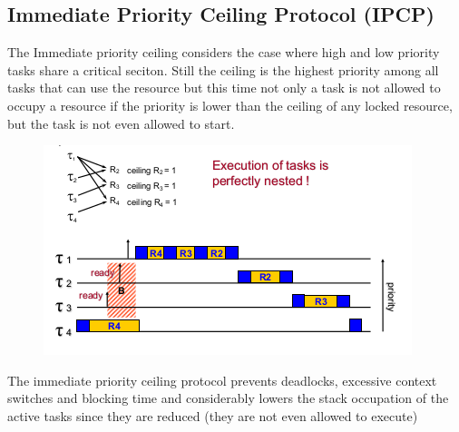 \subsection{Immediate Priority Ceiling Protocol (IPCP)}

The Immediate priority ceiling considers the case where high and low priority tasks share a critical seciton. Still the ceiling is the highest priority among all tasks that can use the resource but this time not only a task is not allowed to occupy a resource if the priority is lower than the ceiling of any locked resource, but the task is not even allowed to start.

\begin{figure}[!h]
    \centering
    \includegraphics[width=.75\textwidth]{images/image13.png}
\end{figure}

The immediate priority ceiling protocol prevents deadlocks, excessive context switches and blocking time and considerably lowers the stack occupation of the active tasks since they are reduced (they are not even allowed to execute)

